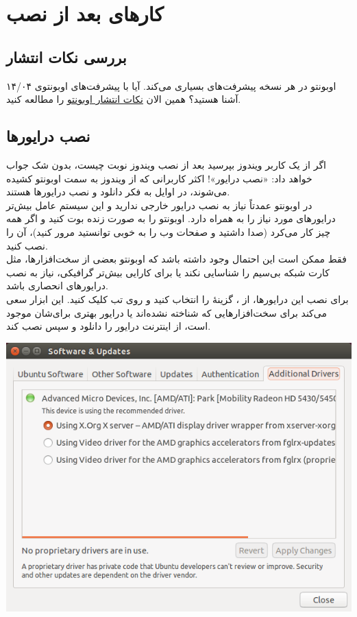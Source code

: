 \chapter{کارهای بعد از نصب}
\section{بررسی نکات انتشار}
 اوبونتو در هر نسخه پیشرفت‌های بسیاری می‌کند. آیا با پیشرفت‌های اوبونتوی ۱۴/۰۴ آشنا هستید؟ همین الان \href{https://wiki.ubuntu.com/TrustyTahr/ReleaseNotes}{نکات انتشار اوبونتو} را مطالعه کنید.


\section{نصب درایورها}
اگر از یک کاربر ویندوز بپرسید بعد از نصب ویندوز نوبت چیست، بدون شک جواب خواهد داد: «نصب درایور»! اکثر کاربرانی که از ویندوز به سمت اوبونتو کشیده می‌شوند، در اوایل به فکر دانلود و نصب درایورها هستند.\\
در اوبونتو عمدتاً نیاز به نصب درایور خارجی ندارید و این سیستم عامل بیش‌تر درایورهای مورد نیاز را به همراه دارد. اوبونتو را به صورت زنده بوت کنید و اگر همه چیز کار می‌کرد (صدا داشتید و صفحات وب را به خوبی توانستید مرور کنید)، آن را نصب کنید.\\
فقط ممکن است این احتمال وجود داشته باشد که اوبونتو بعضی از سخت‌افزارها، مثل کارت شبکه بی‌سیم را شناسایی نکند یا برای کارایی بیش‌تر گرافیکی، نیاز به نصب درایورهای انحصاری باشد.\\
برای نصب این درایورها، از ، گزینهٔ  را انتخاب کنید و روی تب  کلیک کنید. این ابزار سعی می‌کند برای سخت‌افزارهایی که شناخته نشده‌اند یا درایور بهتری برای‌شان موجود است، از اینترنت درایور را دانلود و سپس نصب کند.

\begin{center}
\includegraphics[scale=0.5]{pics/28.png}
\end{center}

